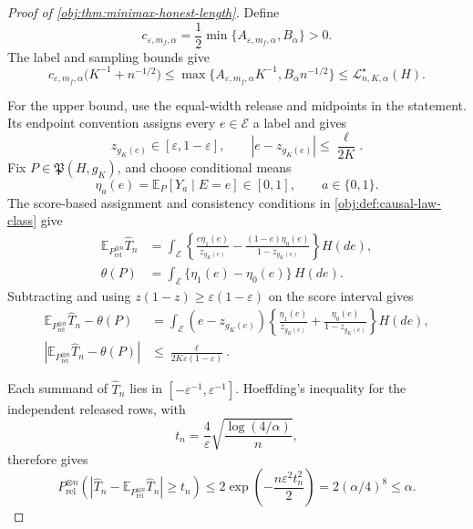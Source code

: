 \documentclass[11pt]{article}
\begin{document}
\begin{proof}[Proof of \cref{obj:thm:minimax-honest-length}]
Define
\[
c_{\varepsilon,m_f,\alpha}
=\frac12\min\{A_{\varepsilon,m_f,\alpha},B_\alpha\}>0.
\]
The label and sampling bounds give
\[
c_{\varepsilon,m_f,\alpha}
\bigl(K^{-1}+n^{-1/2}\bigr)
\leq
\max\{A_{\varepsilon,m_f,\alpha}K^{-1},
      B_\alpha n^{-1/2}\}
\leq\mathcal L^\star_{n,K,\alpha}(H).
\]

For the upper bound, use the equal-width release and midpoints in the statement. Its endpoint convention assigns every \(e\in\mathcal E\) a label and gives
\[
z_{g_K(e)}\in[\varepsilon,1-\varepsilon],
\qquad |e-z_{g_K(e)}|\leq\frac{\ell}{2K}.
\]
Fix \(P\in\mathfrak P(H,g_K)\), and choose conditional means
\[
\eta_a(e)=\mathbb E_P[Y_a\mid E=e]\in[0,1],
\qquad a\in\{0,1\}.
\]
The score-based assignment and consistency conditions in \cref{obj:def:causal-law-class} give
\[
\begin{aligned}
\mathbb E_{P_{\mathrm{rel}}^{\otimes n}}\widehat T_n
&=\int_{\mathcal E}
 \left\{\frac{e\eta_1(e)}{z_{g_K(e)}}
 -\frac{(1-e)\eta_0(e)}{1-z_{g_K(e)}}\right\}H(de),\\
\theta(P)&=\int_{\mathcal E}\{\eta_1(e)-\eta_0(e)\}\,H(de).
\end{aligned}
\]
Subtracting and using \(z(1-z)\geq\varepsilon(1-\varepsilon)\) on the score interval gives
\[
\begin{aligned}
\mathbb E_{P_{\mathrm{rel}}^{\otimes n}}\widehat T_n-\theta(P)
&=\int_{\mathcal E}(e-z_{g_K(e)})
 \left\{\frac{\eta_1(e)}{z_{g_K(e)}}
       +\frac{\eta_0(e)}{1-z_{g_K(e)}}\right\}H(de),\\
\left|\mathbb E_{P_{\mathrm{rel}}^{\otimes n}}\widehat T_n-\theta(P)\right|
&\leq\frac{\ell}{2K\varepsilon(1-\varepsilon)}.
\end{aligned}
\]

Each summand of \(\widehat T_n\) lies in \([-\varepsilon^{-1},\varepsilon^{-1}]\). Hoeffding’s inequality for the independent released rows, with
\[
t_n=\frac4\varepsilon\sqrt{\frac{\log(4/\alpha)}n},
\]
therefore gives
\[
P_{\mathrm{rel}}^{\otimes n}
 \left(\left|\widehat T_n-
 \mathbb E_{P_{\mathrm{rel}}^{\otimes n}}\widehat T_n\right|\geq t_n\right)
\leq 2\exp\!\left(-\frac{n\varepsilon^2t_n^2}{2}\right)
=2(\alpha/4)^8\leq\alpha.
\]


\end{proof}
\end{document}
